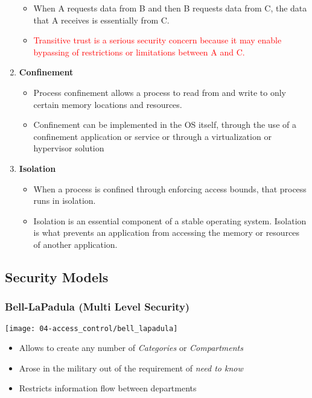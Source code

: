 \begin{enumerate}
    \begin{itemize}
        \item When A requests data from B and then B requests data from C, the data that A receives is essentially from C.
        \item \textcolor{red}{Transitive trust is a serious security concern because it may enable bypassing of restrictions or limitations between A and C.}
    \end{itemize}
    \item \textbf{Confinement}
    \begin{itemize}
        \item Process confinement allows a process to read from and write to only certain memory locations and resources.
        \item Confinement can be implemented in the OS itself, through the use of a confinement application or service or through a virtualization or hypervisor solution
    \end{itemize}
    \item \textbf{Isolation}
    \begin{itemize}
        \item When a process is confined through enforcing access bounds, that process runs in isolation.
        \item Isolation is an essential component of a stable operating system. Isolation is what prevents an application from accessing the memory or resources of another application.
    \end{itemize}
\end{enumerate}

\subsection{Security Models}

\subsubsection{Bell-LaPadula (Multi Level Security)}
\texttt{[image: 04-access\_control/bell\_lapadula]}
\begin{itemize}
    \item Allows to create any number of \textit{Categories} or \textit{Compartments}
    \item Arose in the military out of the requirement of \textit{need to know}
    \item Restricts information flow between departments
\end{itemize}

